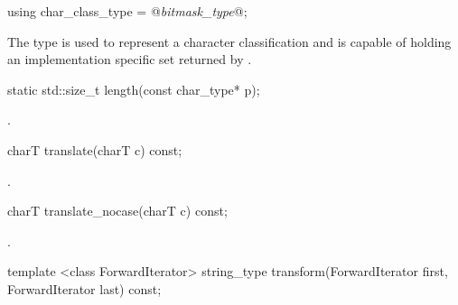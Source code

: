 %
%
\begin{itemdecl}
using char_class_type = @\textit{bitmask_type}@; 
\end{itemdecl}

\begin{itemdescr}
\pnum
The type  is used to represent a character
classification and is capable of holding an implementation specific
set returned by .
\end{itemdescr}

%
%
\begin{itemdecl}
static std::size_t length(const char_type* p); 
\end{itemdecl}

\begin{itemdescr}
\pnum\returns {}.
\end{itemdescr}

%
%
\begin{itemdecl}
charT translate(charT c) const; 
\end{itemdecl}

\begin{itemdescr}
\pnum\returns {}.
\end{itemdescr}

%
%
\begin{itemdecl}
charT translate_nocase(charT c) const; 
\end{itemdecl}

\begin{itemdescr}
\pnum\returns  {}.
\end{itemdescr}

%
%
\begin{itemdecl}
template <class ForwardIterator>
  string_type transform(ForwardIterator first, ForwardIterator last) const; 
\end{itemdecl}

